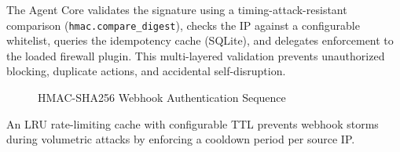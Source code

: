The Agent Core validates the signature using a timing-attack-resistant comparison (\texttt{hmac.compare\_digest}), checks the IP against a configurable whitelist, queries the idempotency cache (SQLite), and delegates enforcement to the loaded firewall plugin. This multi-layered validation prevents unauthorized blocking, duplicate actions, and accidental self-disruption.

\begin{figure}[h]
\centering
{}
\caption{HMAC-SHA256 Webhook Authentication Sequence}
\label{fig:hmac_sequence}
\end{figure}

An LRU rate-limiting cache with configurable TTL prevents webhook storms during volumetric attacks by enforcing a cooldown period per source IP.
